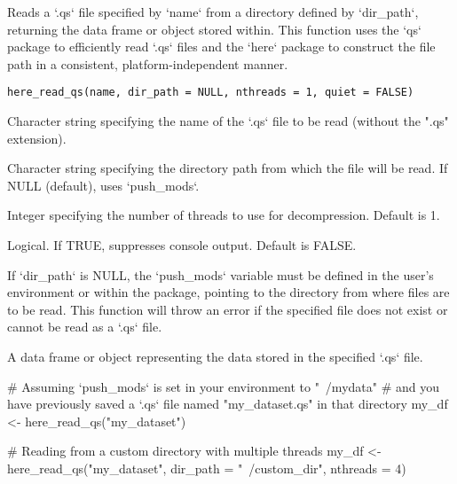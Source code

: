 \documentclass[a4paper]{book}
\begin{document}
%
\begin{Description}
Reads a `.qs` file specified by `name` from a directory defined by `dir\_path`, returning the data frame or object stored within.
This function uses the `qs` package to efficiently read `.qs` files and the `here` package to construct the file path in a consistent, platform-independent manner.
\end{Description}
%
\begin{Usage}
\begin{verbatim}
here_read_qs(name, dir_path = NULL, nthreads = 1, quiet = FALSE)
\end{verbatim}
\end{Usage}
%
\begin{Arguments}
\begin{ldescription}
\item[\code{name}] Character string specifying the name of the `.qs` file to be read (without the ".qs" extension).

\item[\code{dir\_path}] Character string specifying the directory path from which the file will be read. If NULL (default), uses `push\_mods`.

\item[\code{nthreads}] Integer specifying the number of threads to use for decompression. Default is 1.

\item[\code{quiet}] Logical. If TRUE, suppresses console output. Default is FALSE.
\end{ldescription}
\end{Arguments}
%
\begin{Details}
If `dir\_path` is NULL, the `push\_mods` variable must be defined in the user's environment or within the package, pointing to the directory from where files are to be read.
This function will throw an error if the specified file does not exist or cannot be read as a `.qs` file.
\end{Details}
%
\begin{Value}
A data frame or object representing the data stored in the specified `.qs` file.
\end{Value}
%
\begin{Examples}
\begin{ExampleCode}
# Assuming `push_mods` is set in your environment to "~/mydata"
# and you have previously saved a `.qs` file named "my_dataset.qs" in that directory
my_df <- here_read_qs("my_dataset")

# Reading from a custom directory with multiple threads
my_df <- here_read_qs("my_dataset", dir_path = "~/custom_dir", nthreads = 4)

\end{ExampleCode}
\end{Examples}
\end{document}
